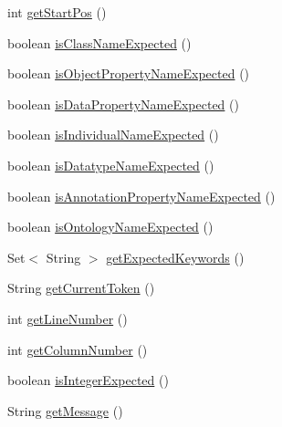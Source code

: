 \begin{DoxyCompactItemize}
int \hyperlink{classorg_1_1semanticweb_1_1owlapi_1_1expression_1_1_parser_exception_ae10f3edb3ff3beba8a8585085d0ddb34}{get\-Start\-Pos} ()
\item 
boolean \hyperlink{classorg_1_1semanticweb_1_1owlapi_1_1expression_1_1_parser_exception_a671e35172cedb384f5dd3126a8a22917}{is\-Class\-Name\-Expected} ()
\item 
boolean \hyperlink{classorg_1_1semanticweb_1_1owlapi_1_1expression_1_1_parser_exception_accb7e4e4f626659f880d73966aab3b40}{is\-Object\-Property\-Name\-Expected} ()
\item 
boolean \hyperlink{classorg_1_1semanticweb_1_1owlapi_1_1expression_1_1_parser_exception_a3a6967ee91a70ec624134a498b192d00}{is\-Data\-Property\-Name\-Expected} ()
\item 
boolean \hyperlink{classorg_1_1semanticweb_1_1owlapi_1_1expression_1_1_parser_exception_a62323649c50f2db4efe72bcdddbc71fc}{is\-Individual\-Name\-Expected} ()
\item 
boolean \hyperlink{classorg_1_1semanticweb_1_1owlapi_1_1expression_1_1_parser_exception_a623dad7252b972aabe8af6ce2490fc57}{is\-Datatype\-Name\-Expected} ()
\item 
boolean \hyperlink{classorg_1_1semanticweb_1_1owlapi_1_1expression_1_1_parser_exception_a48290ef3e3ace6506bbc3aa605886fdc}{is\-Annotation\-Property\-Name\-Expected} ()
\item 
boolean \hyperlink{classorg_1_1semanticweb_1_1owlapi_1_1expression_1_1_parser_exception_a38aae5406e73c28a6a0f646bef853df4}{is\-Ontology\-Name\-Expected} ()
\item 
Set$<$ String $>$ \hyperlink{classorg_1_1semanticweb_1_1owlapi_1_1expression_1_1_parser_exception_a06161849c9e4c5feecd7d42e5358533e}{get\-Expected\-Keywords} ()
\item 
String \hyperlink{classorg_1_1semanticweb_1_1owlapi_1_1expression_1_1_parser_exception_a86eac00f83bc51ff0ddfab983d062550}{get\-Current\-Token} ()
\item 
int \hyperlink{classorg_1_1semanticweb_1_1owlapi_1_1expression_1_1_parser_exception_a82dccb9474363f71639665a93fef3c91}{get\-Line\-Number} ()
\item 
int \hyperlink{classorg_1_1semanticweb_1_1owlapi_1_1expression_1_1_parser_exception_af9a49107d6a19c23a0aa0642ccd8ee0f}{get\-Column\-Number} ()
\item 
boolean \hyperlink{classorg_1_1semanticweb_1_1owlapi_1_1expression_1_1_parser_exception_aea44c5ac815aba69edc613fcc69c4050}{is\-Integer\-Expected} ()
\item 
String \hyperlink{classorg_1_1semanticweb_1_1owlapi_1_1expression_1_1_parser_exception_a2d643f0f5ac6260ce7e8571d9e459e2a}{get\-Message} ()
\end{DoxyCompactItemize}
